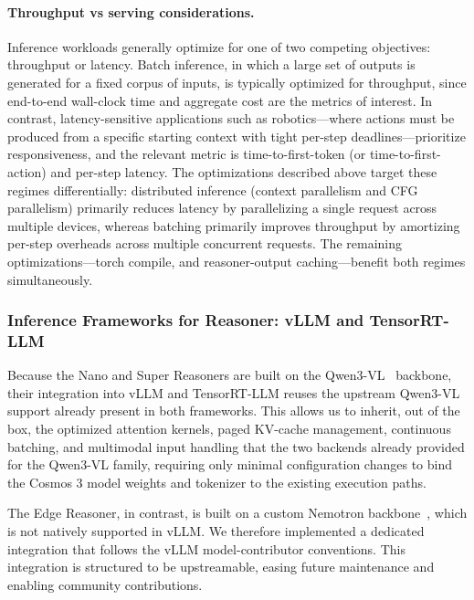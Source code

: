 \paragraph{Throughput vs serving considerations.}

Inference workloads generally optimize for one of two competing objectives: throughput or latency. Batch inference, in which a large set of outputs is generated for a fixed corpus of inputs, is typically optimized for throughput, since end-to-end wall-clock time and aggregate cost are the metrics of interest. In contrast, latency-sensitive applications such as robotics---where actions must be produced from a specific starting context with tight per-step deadlines---prioritize responsiveness, and the relevant metric is time-to-first-token (or time-to-first-action) and per-step latency. The optimizations described above target these regimes differentially: distributed inference (context parallelism and CFG parallelism) primarily reduces latency by parallelizing a single request across multiple devices, whereas batching primarily improves throughput by amortizing per-step overheads across multiple concurrent requests. The remaining optimizations---torch compile, and reasoner-output caching---benefit both regimes simultaneously.

\subsubsection{Inference Frameworks for Reasoner: vLLM and TensorRT-LLM}

Because the Nano and Super Reasoners are built on the Qwen3-VL~\citep{qwen3vl2025} backbone, their integration into vLLM and TensorRT-LLM reuses the upstream Qwen3-VL support already present in both frameworks. This allows us to inherit, out of the box, the optimized attention kernels, paged KV-cache management, continuous batching, and multimodal input handling that the two backends already provided for the Qwen3-VL family, requiring only minimal configuration changes to bind the Cosmos 3 model weights and tokenizer to the existing execution paths.

The Edge Reasoner, in contrast, is built on a custom Nemotron backbone~\citep{nemotron3-family}, which is not natively supported in vLLM. We therefore implemented a dedicated integration that follows the vLLM model-contributor conventions. This integration is structured to be upstreamable, easing future maintenance and enabling community contributions.

